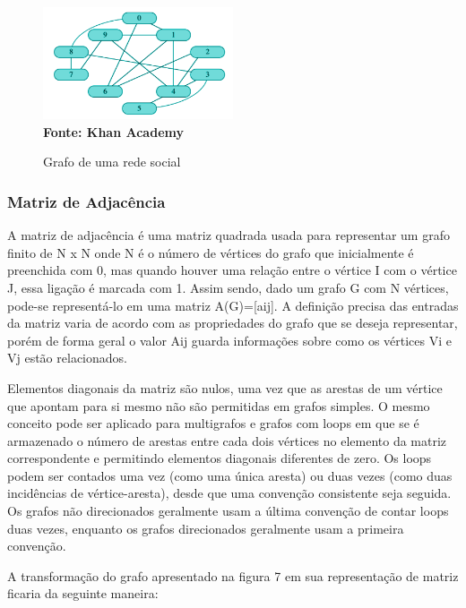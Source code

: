 \begin{figure}[ht]
	\centering	
	\caption[\hspace{0.1cm}Grafo de uma rede social.]{Grafo de uma rede social}
	\vspace{-0.4cm}
	\includegraphics[width=0.5\textwidth]{figuras/grafo-rede-social.png}
	 \vspace{-0.2cm}
	\\\textbf{\footnotesize Fonte: Khan Academy}
	\label{fig:figura1}
\end{figure}

\subsubsection{\esp Matriz de Adjacência}

A matriz de adjacência é uma matriz quadrada usada para representar um grafo finito de  N x N onde N é o número de vértices do grafo que inicialmente é preenchida com 0, mas quando houver uma relação entre o vértice I com o vértice J, essa ligação é marcada com 1. Assim sendo, dado um grafo G com N vértices, pode-se representá-lo em uma matriz A(G)=[aij].
A definição precisa das entradas da matriz varia de acordo com as propriedades do grafo que se deseja representar, porém de forma geral o valor Aij guarda informações sobre como os vértices Vi e Vj estão relacionados. 

Elementos diagonais da matriz são nulos, uma vez que as arestas de um vértice que apontam para si mesmo não são permitidas em grafos simples. O mesmo conceito pode ser aplicado para multigrafos e grafos com loops em que se é armazenado o número de arestas entre cada dois vértices no elemento da matriz correspondente e permitindo elementos diagonais diferentes de zero. Os loops podem ser contados uma vez (como uma única aresta) ou duas vezes (como duas incidências de vértice-aresta), desde que uma convenção consistente seja seguida. Os grafos não direcionados geralmente usam a última convenção de contar loops duas vezes, enquanto os grafos direcionados geralmente usam a primeira convenção.

A transformação do grafo apresentado na figura 7 em sua representação de matriz ficaria da seguinte maneira:

